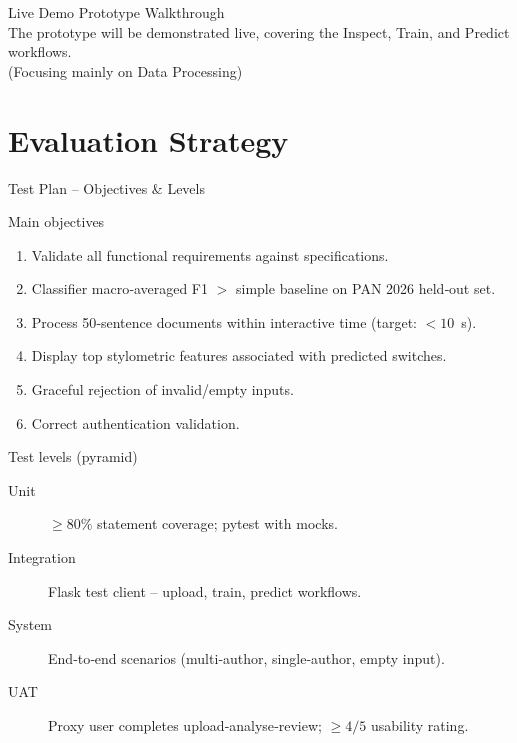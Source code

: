 \documentclass[compress,aspectratio=169]{beamer}
\begin{document}
\begin{frame}{Live Demo}
    \centering
    \Large
    Prototype Walkthrough\\
    \bigskip
    \normalsize
    The prototype will be demonstrated live, covering the Inspect, Train, and Predict workflows.\\
    \vspace{0.5cm}
    \footnotesize
    (Focusing mainly on Data Processing)
\end{frame}

\section{Evaluation Strategy}
\begin{frame}{Test Plan – Objectives \& Levels}
    \begin{block}{Main objectives}
        \begin{enumerate}
            \item Validate all functional requirements against specifications.
            \item Classifier macro‑averaged F1 $>$ simple baseline on PAN 2026 held‑out set.
            \item Process 50‑sentence documents within interactive time (target: $<10$~s).
            \item Display top stylometric features associated with predicted switches.
            \item Graceful rejection of invalid/empty inputs.
            \item Correct authentication validation.
        \end{enumerate}
    \end{block}
    \pause
    \begin{block}{Test levels (pyramid)}
        \begin{description}
            \item[Unit] $\ge 80\%$ statement coverage; pytest with mocks.
            \item[Integration] Flask test client – upload, train, predict workflows.
            \item[System] End‑to‑end scenarios (multi‑author, single‑author, empty input).
            \item[UAT] Proxy user completes upload‑analyse‑review; $\ge 4/5$ usability rating.
        \end{description}
    \end{block}
\end{frame}
\end{document}
